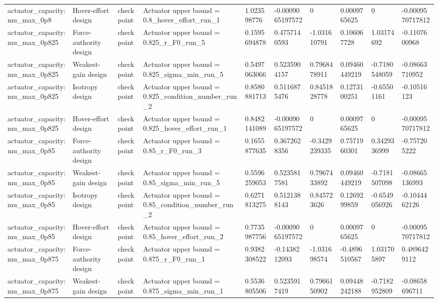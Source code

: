 \begin{tabular}{@{}llllllllll@{}}
actuator\_capacity:mu\_max\_0p8 & Hover-effort design & checkpoint & Actuator upper bound = 0.8\_hover\_effort\_run\_1 & 1.023598776 & -0.0009065197572 & 0 & 0.0009765625 & 0 & -0.0009570717812 \\
actuator\_capacity:mu\_max\_0p825 & Force-authority design & checkpoint & Actuator upper bound = 0.825\_r\_F0\_run\_5 & 0.1595694878 & 0.4757140593 & -1.031610791 & 0.106067728 & 1.03174692 & -0.1107600968 \\
actuator\_capacity:mu\_max\_0p825 & Weakest-gain design & checkpoint & Actuator upper bound = 0.825\_sigma\_min\_run\_5 & 0.5497063066 & 0.5235904157 & 0.7968478911 & 0.09460449219 & -0.7180548059 & -0.08663710952 \\
actuator\_capacity:mu\_max\_0p825 & Isotropy design & checkpoint & Actuator upper bound = 0.825\_condition\_number\_run\_2 & 0.8580881713 & 0.5116875476 & 0.8451828778 & 0.1273100251 & -0.65501161 & -0.10516123 \\
actuator\_capacity:mu\_max\_0p825 & Hover-effort design & checkpoint & Actuator upper bound = 0.825\_hover\_effort\_run\_1 & 0.8482141089 & -0.0009065197572 & 0 & 0.0009765625 & 0 & -0.0009570717812 \\
actuator\_capacity:mu\_max\_0p85 & Force-authority design & checkpoint & Actuator upper bound = 0.85\_r\_F0\_run\_3 & 0.1655877635 & 0.3672628356 & -0.3429239335 & 0.7571960301 & 0.3429336999 & -0.757205222 \\
actuator\_capacity:mu\_max\_0p85 & Weakest-gain design & checkpoint & Actuator upper bound = 0.85\_sigma\_min\_run\_5 & 0.5596259053 & 0.5235817581 & 0.7967433892 & 0.09460449219 & -0.7181507098 & -0.08665136993 \\
actuator\_capacity:mu\_max\_0p85 & Isotropy design & checkpoint & Actuator upper bound = 0.85\_condition\_number\_run\_2 & 0.6271813275 & 0.5121388143 & 0.845723626 & 0.1269299859 & -0.6549056926 & -0.1044462126 \\
actuator\_capacity:mu\_max\_0p85 & Hover-effort design & checkpoint & Actuator upper bound = 0.85\_hover\_effort\_run\_2 & 0.7735987756 & -0.0009065197572 & 0 & 0.0009765625 & 0 & -0.0009570717812 \\
actuator\_capacity:mu\_max\_0p875 & Force-authority design & checkpoint & Actuator upper bound = 0.875\_r\_F0\_run\_1 & 0.9382308522 & -0.1438212093 & -1.031698574 & -0.4896510567 & 1.031705897 & 0.4896429112 \\
actuator\_capacity:mu\_max\_0p875 & Weakest-gain design & checkpoint & Actuator upper bound = 0.875\_sigma\_min\_run\_1 & 0.5536805506 & 0.5235917419 & 0.7966150902 & 0.09448242188 & -0.7182952809 & -0.08658696711 \\

\end{tabular}
